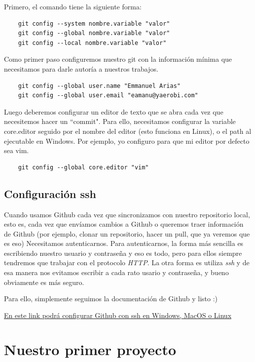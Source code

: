 \documentclass[a4paper]{article}
\begin{document}
Primero, el comando tiene la siguiente forma:

\begin{verbatim}
	git config --system nombre.variable "valor"
	git config --global nombre.variable "valor"
	git config --local nombre.variable "valor"
\end{verbatim}

Como primer paso configuremos nuestro git con la información mínima
que necesitamos para darle autoría a nuestros trabajos.

\begin{verbatim}
	git config --global user.name "Emmanuel Arias"
	git config --global user.email "eamanu@yaerobi.com"
\end{verbatim}

Luego deberemos configurar un editor de texto que se abra cada vez que 
necesitemos hacer un ``commit". Para ello, necesitamos configurar la variable
core.editor seguido por el nombre del editor (esto funciona en Linux), o
el path al ejecutable en Windows. Por ejemplo, yo configuro para que mi editor
por defecto sea vim.

\begin{verbatim}
	git config --global core.editor "vim"
\end{verbatim}

\subsection{Configuración ssh}
\label{sec:sshconfig}

Cuando usamos Github cada vez que sincronizamos con nuestro repositorio local, 
esto es, cada vez que envíamos cambios a Github o queremos traer información
de Github (por ejemplo, clonar un repositorio, hacer un pull, que ya veremos
que es eso) Necesitamos autenticarnos. Para autenticarnos, la forma más sencilla
es escribiendo nuestro usuario y contraseña y eso es todo, pero para ellos
siempre tendremos que trabajar con el protocolo \textit{HTTP}. La otra forma
es utiliza \textit{ssh} y de esa manera nos evitamos escribir a cada rato
usario y contraseña, y bueno obviamente es más seguro.

Para ello, simplemente seguimos la documentación de Github y listo :)

\href{https://docs.github.com/es/github/authenticating-to-github/adding-a-new-ssh-key-to-your-github-account}{En este link podrá configurar Github con ssh en Windows, MacOS o Linux}

\section{Nuestro primer proyecto}
\end{document}

